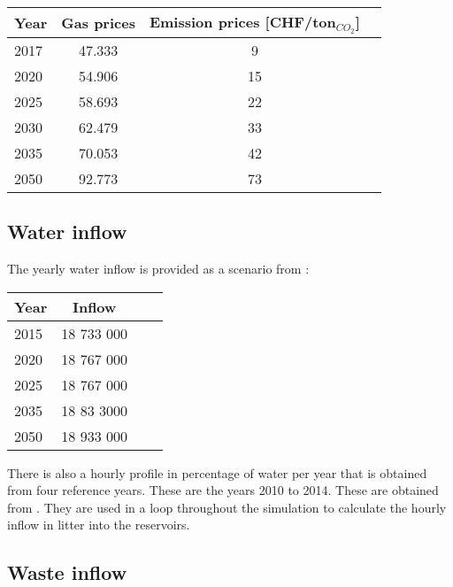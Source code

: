 \begin{center}
\begin{tabular}{ |l|c|c|c| } 
\hline
Year		& Gas prices	& Emission prices [CHF/ton$_{CO_2}$]	\\ \hline \hline
2017		& 47.333		& 9		\\ \hline
2020		& 54.906		& 15		\\ \hline
2025		& 58.693		& 22		\\ \hline
2030		& 62.479		& 33		\\ \hline
2035		& 70.053		& 42		\\ \hline
2050		& 92.773		& 73		\\ \hline
\end{tabular}
\end{center}


\subsection{Water inflow}

The yearly water inflow is provided as a scenario from \cite{vse2012scenarios}:

\begin{center}
\begin{tabular}{ |l|c|c|c| } 
\hline
Year		& Inflow 		\\ \hline \hline
2015		& 18 733 000	\\ \hline
2020		& 18 767 000	\\ \hline
2025		& 18 767 000	\\ \hline
2035		& 18 83 3000	\\ \hline
2050		& 18 933 000	\\ \hline
\end{tabular}
\end{center}

There is also a hourly profile in percentage of water per year that is obtained from four reference years. These are the years 2010 to 2014. These are obtained from \cite{demiray2018Modellierung}. They are used in a loop throughout the simulation to calculate the hourly inflow in litter into the reservoirs.


\subsection{Waste inflow}

